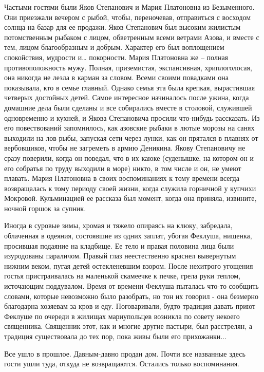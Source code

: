 Частыми гостями были Яков Степанович и Мария Платоновна из Безыменного. Они
приезжали вечером с рыбой, чтобы, переночевав, отправиться с восходом солнца на
базар для ее продажи. Яков Степанович был высоким жилистым потомственным
рыбаком с лицом, обветренным всеми ветрами Азова, и вместе с тем, лицом
благообразным и добрым. Характер его был воплощением спокойствия, мудрости и…
покорности. Мария Платоновна же – полная противоположность мужу. Полная,
приземистая, экспансивная, хриплоголосая, она никогда не лезла в карман за
словом. Всеми своими повадками она показывала, кто в семье главный. Однако
семья эта была крепкая, вырастившая четверых достойных детей. Самое интересное
начиналось после ужина, когда домашние дела были сделаны и все собирались
вместе в столовой, служившей одновременно и кухней, и Якова Степановича просили
что-нибудь рассказать. Из его повествований запомнилось, как азовские рыбаки в
лютые морозы на санях выходили на лов рыбы, запуская сети через лунки, как он
прятался в плавнях от вербовщиков, чтобы не загреметь в армию Деникина. Якову
Степановичу не сразу поверили, когда он поведал, что в их каюке (суденышке, на
котором он и его собратья по труду выходили в море) никто, в том числе и он, не
умеют плавать. Мария Платоновна в своих воспоминаниях к тому времени всегда
возвращалась к тому периоду своей жизни, когда служила горничной у купчихи
Мокровой. Кульминацией ее рассказа был момент, когда она приняла, извините,
ночной горшок за супник.

Иногда в суровые зимы, хромая и тяжело опираясь на клюку, забредала, облаченная
в одеяния, состоявшие из одних заплат, убогая Феклуша, нищенка, просившая
подаяние на кладбище. Ее тело и правая половина лица были изуродованы
параличом. Правый глаз неестественно краснел вывернутым нижним веком, пугая
детей остекленевшим взором. После нехитрого угощения гостья пристраивалась на
маленькой скамеечке к печке, грела руки теплом, источающим поддувалом. Время от
времени Феклуша пыталась что-то сообщить словами, которые невозможно было
разобрать, но тон их говорил - она безмерно благодарна хозяевам за кров и еду.
Поговаривали, будто традиция давать приют Феклуше по очереди в жилищах
мариупольцев возникла по совету некоего священника. Священник этот, как и
многие другие пастыри, был расстрелян, а традиция существовала до тех пор, пока
живы были его прихожанки...

Все ушло в прошлое. Давным-давно продан дом. Почти все названные здесь гости
ушли туда, откуда не возвращаются. Остались только воспоминания.
